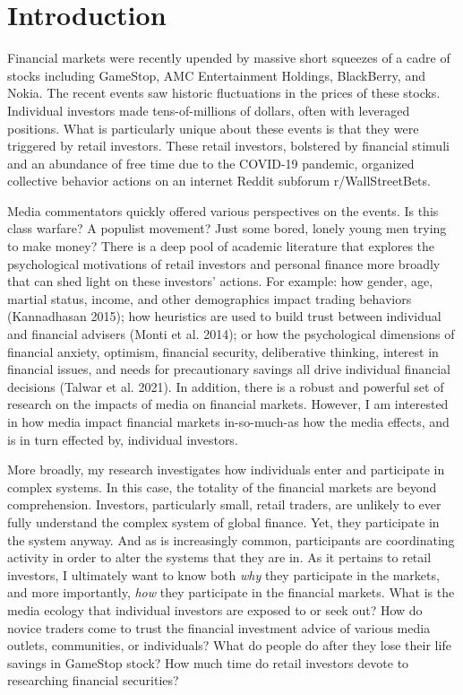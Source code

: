 \documentclass[12pt,]{article}
\begin{document}
\hypertarget{introduction}{%
\section{Introduction}\label{introduction}}

Financial markets were recently upended by massive short squeezes of a
cadre of stocks including GameStop, AMC Entertainment Holdings,
BlackBerry, and Nokia. The recent events saw historic fluctuations in
the prices of these stocks. Individual investors made tens-of-millions
of dollars, often with leveraged positions. What is particularly unique
about these events is that they were triggered by retail investors.
These retail investors, bolstered by financial stimuli and an abundance
of free time due to the COVID-19 pandemic, organized collective behavior
actions on an internet Reddit subforum r/WallStreetBets.

Media commentators quickly offered various perspectives on the events.
Is this class warfare? A populist movement? Just some bored, lonely
young men trying to make money? There is a deep pool of academic
literature that explores the psychological motivations of retail
investors and personal finance more broadly that can shed light on these
investors' actions. For example: how gender, age, martial status,
income, and other demographics impact trading behaviors (Kannadhasan
2015); how heuristics are used to build trust between individual and
financial advisers (Monti et al. 2014); or how the psychological
dimensions of financial anxiety, optimism, financial security,
deliberative thinking, interest in financial issues, and needs for
precautionary savings all drive individual financial decisions (Talwar
et al. 2021). In addition, there is a robust and powerful set of
research on the impacts of media on financial markets. However, I am
interested in how media impact financial markets in-so-much-as how the
media effects, and is in turn effected by, individual investors.

More broadly, my research investigates how individuals enter and
participate in complex systems. In this case, the totality of the
financial markets are beyond comprehension. Investors, particularly
small, retail traders, are unlikely to ever fully understand the complex
system of global finance. Yet, they participate in the system anyway.
And as is increasingly common, participants are coordinating activity in
order to alter the systems that they are in. As it pertains to retail
investors, I ultimately want to know both \emph{why} they participate in
the markets, and more importantly, \emph{how} they participate in the
financial markets. What is the media ecology that individual investors
are exposed to or seek out? How do novice traders come to trust the
financial investment advice of various media outlets, communities, or
individuals? What do people do after they lose their life savings in
GameStop stock? How much time do retail investors devote to researching
financial securities?
\end{document}
